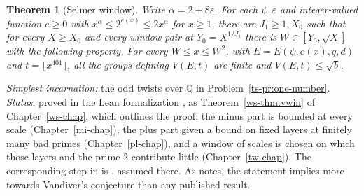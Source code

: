 \documentclass[reqno]{amsart}
\newcounter{chap}
\theoremstyle{definition}
\theoremstyle{plain}
\newtheorem{theorem}{Theorem}[section]
\newcommand{\Q}{\mathbb Q}
\begin{document}
\begin{theorem}[Selmer window]\label{hyp:window}
Write \(\alpha=2+8\varepsilon\).  For each \(\psi,\varepsilon\) and integer-valued function \(e\ge0\) with \(x^\alpha\le2^{e(x)}\le2x^\alpha\) for \(x\ge1\), there are \(J_1\ge1,X_0\) such that for every \(X\ge X_0\) and every window pair at \(Y_0=X^{1/J_1}\) there is \(W\in[Y_0,\sqrt X]\) with the following property.  For every \(W\le x\le W^2\), with \(E=E(\psi,e(x),q,d)\) and \(t=\lfloor x^{401}\rfloor\), all the groups defining \(V(E,t)\) are finite and \(V(E,t)\le\sqrt b\).
\end{theorem}
\noindent\emph{Simplest incarnation:} the odd twists over \(\Q\) in Problem~\ref{ts-pr:one-number}. \emph{Status}: proved in the Lean formalization \cite{Lean}, as Theorem~\ref{ws-thm:vwin} of Chapter~\ref{ws-chap}, which outlines the proof: the minus part is bounded at every scale (Chapter~\ref{mi-chap}), the plus part given a bound on fixed layers at finitely many bad primes (Chapter~\ref{pl-chap}), and a window of scales is chosen on which those layers and the prime \(2\) contribute little (Chapter~\ref{tw-chap}).  The corresponding step in \cite{Adr} is \cite[Hyp.~17.11]{Adr}, assumed there.  As \cite[\S17.4]{Adr} notes, the statement implies more towards Vandiver's conjecture than any published result.
\end{document}
